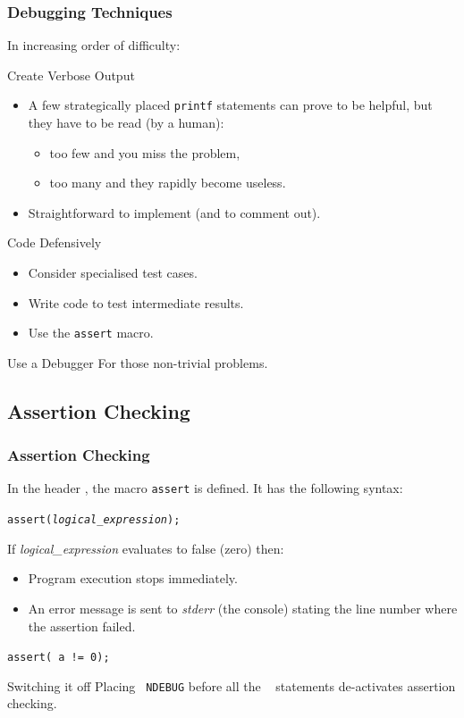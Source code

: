 \documentclass[smaller,table]{beamer}
\begin{document}
\begin{frame}
\frametitle{Debugging Techniques}
{\footnotesize
In increasing order of difficulty:
\begin{block}{Create Verbose Output}
\begin{itemize}
\item A few strategically placed {\tt printf} statements can prove to be helpful, but they have to be read (by a human):
\begin{itemize}
\item too few and you miss the problem,
\item too many and they rapidly become useless.
\end{itemize}
\item Straightforward to implement (and to comment out).
\end{itemize}
\end{block}

\begin{block}{Code Defensively}
\begin{itemize}
\item Consider specialised test cases.
\item Write code to test intermediate results.
\item Use the {\tt assert} macro.
\end{itemize}
\end{block}

\begin{block}{Use a Debugger}
For those non-trivial problems.
\end{block}
}
\end{frame}

\subsection{Assertion Checking}
\begin{frame}
\frametitle{Assertion Checking}
In the header , the macro {\tt assert} is defined. It has the following syntax:\\
\begin{center}
\tt assert(\emph{logical\_expression});
\end{center}
If \emph{logical\_expression} evaluates to false (zero) then:
\begin{itemize}
\item Program execution stops immediately.
\item An error message is sent to \emph{stderr} (the console) stating the line number where the assertion failed.
\end{itemize} 
\begin{block}{}
{\tt assert( a != 0); }
\end{block}
\begin{exampleblock}{Switching it off}
Placing {\tt {} NDEBUG} before all the \mbox{\tt {} }
statements de-activates assertion checking.
\end{exampleblock}
\end{frame}
\end{document}
